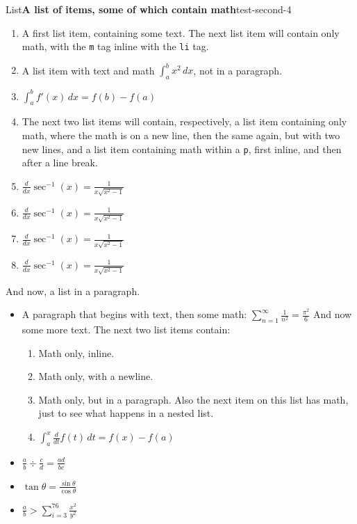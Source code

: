 \documentclass[pdflatex]{sn-jnl}
\theoremstyle{thmstyleone}%
\theoremstyle{thmstyletwo}%
\theoremstyle{thmstylethree}%
\newcommand{\mono}[1]{\texttt{#1}}
\numberwithin{equation}{section}
\newcommand{\gt}{>}
\begin{document}
\begin{listptx}{List}{\textbf{A list of items, some of which contain math}}{test-second-4}{}%
%
\begin{enumerate}
\item{}A first list item, containing some text. The next list item will contain only math, with the \mono{m} tag inline with the \mono{li} tag.%
\item{}A list item with text and math \(\int_a^b x^2\,dx\), not in a paragraph.%
\item{}\(\displaystyle \int_a^b f'(x)\, dx = f(b)-f(a)\)%
\item{}The next two list items will contain, respectively, a list item containing only math, where the math is on a new line, then the same again, but with two new lines, and a list item containing math within a \mono{p}, first inline, and then after a line break.%
\item{}\(\displaystyle \frac{d}{dx}\sec^{-1}(x) = \frac{1}{x\sqrt{x^2-1}}\)%
\item{}\(\displaystyle \frac{d}{dx}\sec^{-1}(x) = \frac{1}{x\sqrt{x^2-1}}\)%
\item{}\(\displaystyle \frac{d}{dx}\sec^{-1}(x) = \frac{1}{x\sqrt{x^2-1}}\)%
\item{}\(\displaystyle \frac{d}{dx}\sec^{-1}(x) = \frac{1}{x\sqrt{x^2-1}}\)%
\end{enumerate}
\end{listptx}%
And now, a list in a paragraph.%
\par
%
\begin{itemize}[label=\textbullet]
\item{}A paragraph that begins with text, then some math: \(\sum_{n=1}^\infty\frac{1}{n^2}=\frac{\pi^2}{6}\) And now some more text. The next two list items contain:%
\begin{enumerate}
\item{}Math only, inline.%
\item{}Math only, with a newline.%
\item{}Math only, but in a paragraph. Also the next item on this list has math, just to see what happens in a nested list.%
\item{}\(\displaystyle \int_a^x \frac{d}{dt}f(t)\,dt = f(x)-f(a)\)%
\end{enumerate}
%
\item{}\(\displaystyle \frac{a}{b}\div \frac{c}{d} = \frac{ad}{bc}\)%
\item{}\(\displaystyle \tan\theta = \frac{\sin\theta}{\cos\theta}\)%
\item{}\(\displaystyle \frac{a}{b}\gt \sum_{i=3}^{76}\frac{x^2}{y^2}\)%
\end{itemize}
\end{document}
